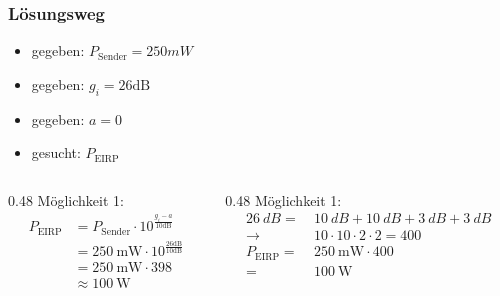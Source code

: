 \begin{frame}
    \frametitle{Lösungsweg}
    \begin{itemize}
        \item gegeben: $P_{\mathrm{Sender}} = 250mW$
        \item gegeben: $g_i = 26\mathrm{dB}$
        \item gegeben: $a = 0$
        \item gesucht: $P_{\mathrm{EIRP}}$
    \end{itemize}
    \vspace{10pt}
    \begin{columns}[T]
        \begin{column}{0.48\linewidth}
            \pause
            Möglichkeit 1:
            \begin{equation*}
                \begin{split}
                    P_{\text{EIRP}} & = P_{\text{Sender}} \cdot 10^{\frac{g_i - a}{10\text{dB}}} \\
                                      & = \qty{250}{\milli\watt} \cdot 10^{\frac{26\text{dB}}{10\text{dB}}}         \\
                                      & = \qty{250}{\milli\watt} \cdot 398                                              \\
                                      & \approx \qty{100}{\watt}
                \end{split}
            \end{equation*}
        \end{column}
        \begin{column}{0.48\linewidth}
            \pause
            Möglichkeit 1:
            \begin{equation*}
                \begin{split}
                    \qty{26}{dB}      = & ~\qty{10}{dB} + \qty{10}{dB} + \qty{3}{dB} + \qty{3}{dB}\\
                    \rightarrow         & ~10 \cdot 10 \cdot 2 \cdot 2 = 400\\
                    P_{\mathrm{EIRP}} = & ~\qty{250}{\milli\watt} \cdot 400\\
                                      = & ~\qty{100}{\watt}
                \end{split}
            \end{equation*}
        \end{column}
    \end{columns}
\end{frame}

